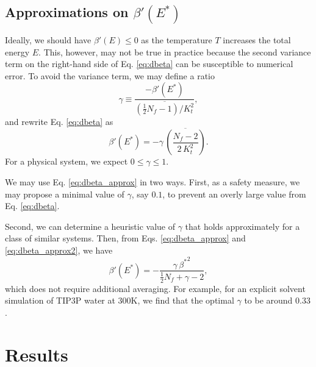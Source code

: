 \documentclass[reprint]{revtex4-1}
\begin{document}
\subsection{Approximations on $\beta'(E^*)$}


Ideally, we should have $\beta'(E) \le 0$
as the temperature $T$ increases the total energy $E$.
%
This, however, may not be true in practice
because the second variance term on the right-hand side
of Eq. \eqref{eq:dbeta}
can be susceptible to numerical error.
%
%
To avoid the variance term,
we may define a ratio 
%
\begin{equation}
  \gamma
  \equiv
  \frac
  {
    -\beta'(E^*)
  }
  {
    \overline{
      \left( \frac 1 2 N_f - 1  \right) / K_t^2
    }
  }
  ,
  \label{eq:gamma_def}
\end{equation}
%
and rewrite Eq. \eqref{eq:dbeta} as
%
\begin{equation}
  \beta'(E^*)
  =
  -\gamma \, \overline{
    \left(
      \frac{ N_f - 2 }
           { 2 \, K_t^2 }
    \right)
    }
  .
  \label{eq:dbeta_approx}
\end{equation}
%
For a physical system, we expect $0 \le \gamma \le 1$.

We may use Eq. \eqref{eq:dbeta_approx} in two ways.
%
First, as a safety measure,
we may propose a minimal value of $\gamma$, say $0.1$,
to prevent an overly large value from Eq. \eqref{eq:dbeta}.

Second,
we can determine a heuristic value of $\gamma$
that holds approximately for a class of similar systems.
%
Then,
from Eqs. \eqref{eq:dbeta_approx} and \eqref{eq:dbeta_approx2},
we have
%
\begin{equation}
  \beta'(E^*)
  =
  -\frac{ \gamma \, {\beta^*}^2 }
  { \frac{1}{2} N_f + \gamma - 2 }
  ,
  \label{eq:dbeta_approx2}
\end{equation}
%
which does not require additional averaging.
%
For example,
for an explicit solvent simulation of TIP3P water\cite{jorgensen1983}
at 300K, we find that the optimal $\gamma$
to be around $0.33$.



\section{Results}
\end{document}
